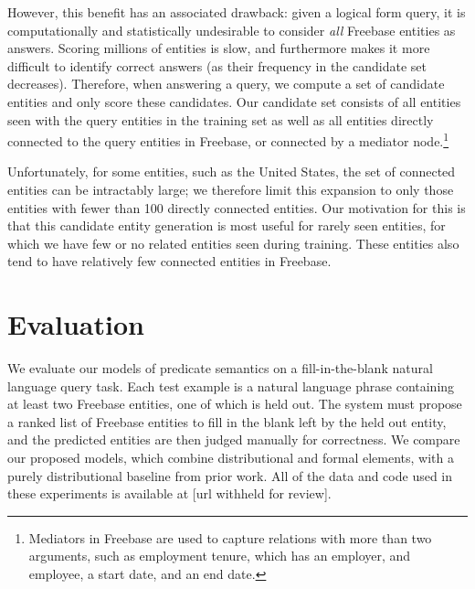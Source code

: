 \documentclass[11pt]{article}
\begin{document}
However, this benefit has an associated drawback: given a logical form
query, it is computationally and statistically undesirable to consider
\emph{all} Freebase entities as answers. Scoring millions of entities
is slow, and furthermore makes it more difficult to identify correct
answers (as their frequency in the candidate set
decreases). Therefore, when answering a query, we compute a set of
candidate entities and only score these candidates. Our candidate set
consists of all entities seen with the query entities in the training
set as well as all entities directly connected to the query entities
in Freebase, or connected by a mediator node.\footnote{Mediators in
  Freebase are used to capture relations with more than two arguments,
  such as employment tenure, which has an employer, and employee, a
  start date, and an end date.}


Unfortunately, for some entities, such as the United States, the set
of connected entities can be intractably large; we therefore limit
this expansion to only those entities with fewer than 100 directly
connected entities.  Our motivation for this is that this candidate
entity generation is most useful for rarely seen entities, for which
we have few or no related entities seen during training.  These
entities also tend to have relatively few connected entities in
Freebase.

\section{Evaluation}
\label{sec:evaluation}

We evaluate our models of predicate semantics on a fill-in-the-blank
natural language query task.  Each test example is a natural language
phrase containing at least two Freebase entities, one of which is held
out.  The system must propose a ranked list of Freebase entities to
fill in the blank left by the held out entity, and the predicted
entities are then judged manually for correctness.  We compare our
proposed models, which combine distributional and formal elements,
with a purely distributional baseline from prior work.  All of the
data and code used in these experiments is available at [url withheld
for review].
\end{document}
